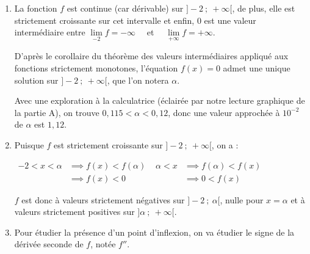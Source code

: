 \begin{enumerate}
Le trinôme n'a donc pas de racines réelles, et a donc des images strictement positives pour tout $x$ réel.

$f'$ est donc une fonction à valeurs strictement positives sur $]-2~;~+\infty[$, et $f$ est donc strictement croissante sur $]-2~;~+\infty[$.

On peut donc établir le tableau de variations suivant :

	\hfill~\hfill~

\item La fonction $f$ est continue (car dérivable) sur $]-2~;~+\infty[$, de plus, elle est strictement croissante sur cet intervalle et enfin, 0 est une valeur intermédiaire entre $\lim\limits_{-2}f = -\infty$ ~~et~~ $\lim\limits_{+\infty}f = + \infty$.

D'après le corollaire du théorème des valeurs intermédiaires appliqué aux fonctions strictement monotones, l'équation $f(x) = 0$ admet une unique solution sur $]- 2~;~+\infty[$, que l'on notera $\alpha$.

Avec une exploration à la calculatrice (éclairée par notre lecture graphique de la partie A), on trouve $0,115 < \alpha < 0,12$, donc une valeur approchée à $10^{-2}$ de $\alpha$ est $1,12$.

\item Puisque $f$ est strictement croissante sur $]-2~;~+\infty[$, on a :

$\begin{aligned} -2 < x <\alpha &\implies f(x) < f(\alpha)\\
&\implies f(x) < 0\end{aligned}$ \hfill
$\begin{aligned} \alpha <x  &\implies  f(\alpha) < f(x)\\
&\implies 0< f(x) \end{aligned}$\hfill~

$f$ est donc à valeurs strictement négatives sur $]-2~;~\alpha[$, nulle pour $x = \alpha$ et à valeurs strictement positives sur $]\alpha~;~+\infty[$.

\item Pour étudier la présence d'un point d'inflexion, on va étudier le signe de la dérivée seconde de $f$, notée $f''$.


\end{enumerate}
